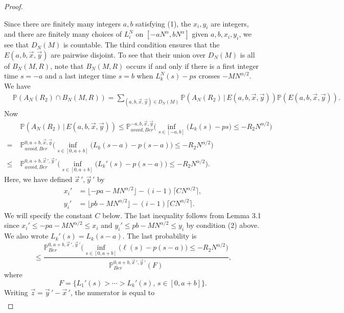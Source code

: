 \documentclass[12pt]{article}
\begin{document}
\begin{proof}
\begin{enumerate}[label=(\arabic*)]
		\end{enumerate} 
		Since there are finitely many integers $a,b$ satisfying (1), the $x_i,y_i$ are integers, and there are finitely many choices of $L_i^N$ on $[-aN^\alpha, bN^\alpha]$ given $a,b,x_i,y_i$, we see that $D_N(M)$ is countable. The third condition ensures that the $E(a,b,\vec{x},\vec{y})$ are pairwise disjoint. To see that their union over $D_N(M)$ is all of $B_N(M,R)$, note that $B_N(M,R)$ occurs if and only if there is a first integer time $s=-a$ and a last integer time $s=b$ when $L_k^N(s)-ps$ crosses $-MN^{\alpha/2}$. We have
		\begin{align*}
		&\mathbb{P}(A_N(R_2) \cap B_N(M,R)) = \sum_{(a,b,\vec{x},\vec{y})\in D_N(M)} \mathbb{P}(A_N(R_2)\,|\,E(a,b,\vec{x},\vec{y}))\mathbb{P}(E(a,b,\vec{x},\vec{y})).
		\end{align*}
		Now
		\begin{align}
		&\mathbb{P}(A_N(R_2)\,|\,E(a,b,\vec{x},\vec{y})) \leq \mathbb{P}^{-a,b, \vec{x}, \vec{y}}_{avoid, Ber} \Big( \inf_{s\in[-a, b]} \big(L_k(s) - ps\big) \leq -R_2N^{\alpha/2} \Big) \label{4.3main}\\
		= \; & \mathbb{P}^{0, a+b, \vec{x}, \vec{y}}_{avoid, Ber} \Big( \inf_{s\in[0,a+b]} \big(L_k(s-a) - p(s-a)\big) \leq -R_2N^{\alpha/2} \Big) \nonumber\\
		\leq \; & \mathbb{P}^{0, a+b, \vec{x}\,', \vec{y}\,'}_{avoid, Ber} \Big( \inf_{s\in[0,a+b]} \big(L_k'(s) - p(s-a)\big) \leq -R_2N^{\alpha/2} \Big) \nonumber.
		\end{align}
		Here, we have defined $\vec{x}\,',\vec{y}\,'$ by
		\begin{align*}
		x_i' &= \lfloor - pa - MN^{\alpha/2}\rfloor - (i-1)\lceil CN^{\alpha/2}\rceil,\\
		y_i' &= \lfloor pb - MN^{\alpha/2}\rfloor - (i-1)\lceil CN^{\alpha/2}\rceil.
		\end{align*} 
		We will specify the constant $C$ below. The last inequality follows from Lemma 3.1 since $x_i' \leq -pa - MN^{\alpha/2} \leq x_i$ and $y_i' \leq pb - MN^{\alpha/2} \leq y_i$ by condition (2) above. We also wrote $L_k'(s) = L_k(s-a)$. The last probability is
		\[
		\leq \frac{\mathbb{P}^{0, a+b, \vec{x}\,', \vec{y}\,'}_{Ber} \Big( \inf_{s\in[0,a+b]} \big(\ell(s) - p(s-a)\big) \leq -R_2 N^{\alpha/2} \Big)}{\mathbb{P}^{0, a+b, \vec{x}\,', \vec{y}\,'}_{Ber}(F)},
		\]
		where
		\[
		F = \{L_1'(s) > \cdots > L_k'(s), \,s\in [0, a+b]\}.
		\]
		Writing $\vec{z} = \vec{y}\,' - \vec{x}\,'$, the numerator is equal to
		\begin{align*}

\end{align*}
\end{proof}
\end{document}
